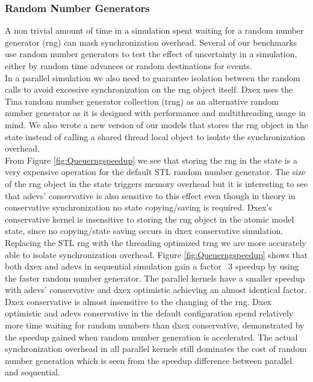 \subsubsection{Random Number Generators}
A non trivial amount of time in a simulation spent waiting for a random number generator (rng) can mask synchronization overhead. Several of our benchmarks use random number generators to test the effect of uncertainty in a simulation, either by random time advances or random destinations for events. \\
In a parallel simulation we also need to guarantee isolation between the random calls to avoid excessive synchronization on the rng object itself.
Dxex uses the Tina random number generator collection (trng) \cite{PhysRevE.75.066701} as an alternative random number generator as it is designed with performance and multithreading usage in mind.
We also wrote a new version of our models that stores the rng object in the state instead of calling a shared thread local object to isolate the synchronization overhead.\\
From Figure \ref{fig:Queuerngspeedup} we see that storing the rng in the state is a very expensive operation for the default STL random number generator. The size of the rng object in the state triggers memory overhead but it is interesting to see that adevs' conservative is also sensitive to this effect even though in theory in conservative synchronization no state copying/saving is required.
Dxex's conservative kernel is insensitive to storing the rng object in the atomic model state, since no copying/state saving occurs in dxex conservative simulation. \\
Replacing the STL rng with the threading optimized trng we are more accurately able to isolate synchronization overhead. Figure \ref{fig:Queuerngspeedup} shows that both dxex and adevs in sequential simulation gain a factor ~3 speedup by using the faster random number generator. The parallel kernels have a smaller speedup with adevs' conservative and dxex optimistic achieving an almost identical factor. Dxex conservative is almost insensitive to the changing of the rng.
Dxex optimistic and adevs conservative in the default configuration spend relatively more time waiting for random numbers than dxex conservative, demonstrated by the speedup gained when random number generation is accelerated.
The actual synchronization overhead in all parallel kernels still dominates the cost of random number generation which is seen from the speedup difference between parallel and sequential.\\
